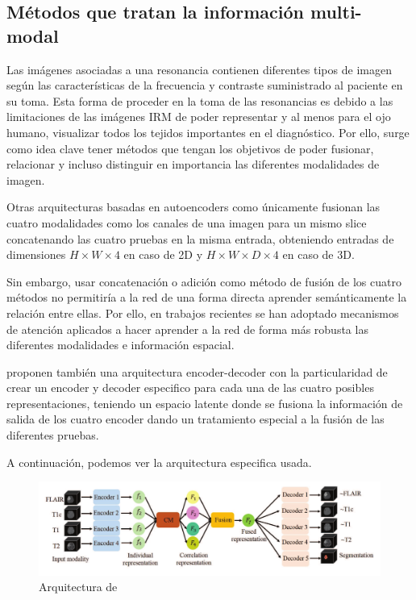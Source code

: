 			
		\subsection{Métodos que tratan la información multi-modal}
		
		Las imágenes asociadas a una resonancia contienen diferentes tipos de imagen según las características de la frecuencia y contraste suministrado al paciente en su toma. Esta forma de proceder en la toma de las resonancias es debido a las limitaciones de las imágenes IRM de poder representar y al menos para el ojo humano, visualizar todos los tejidos importantes en el diagnóstico. Por ello, surge como idea clave tener métodos que tengan los objetivos de poder fusionar, relacionar y incluso distinguir en importancia las diferentes modalidades de imagen.
		
		Otras arquitecturas basadas en autoencoders como \cite{myronenko20193d} únicamente fusionan las cuatro modalidades como los canales de una imagen para un mismo slice concatenando las cuatro pruebas en la misma entrada, obteniendo entradas de dimensiones $ H \times W \times 4 $ en caso de 2D y $ H \times W \times D \times 4$ en caso de 3D.
		
		Sin embargo, usar concatenación o adición como método de fusión de los cuatro métodos no permitiría a la red de una forma directa aprender semánticamente la relación entre ellas. Por ello, en trabajos recientes se han adoptado mecanismos de atención aplicados a hacer aprender a la red de forma más robusta las diferentes modalidades e información espacial.
		
		\cite{zhou2021latent} proponen también una arquitectura encoder-decoder con la particularidad de crear un encoder y decoder especifico para cada una de las cuatro posibles representaciones, teniendo un espacio latente donde se fusiona la información de salida de los cuatro encoder dando un tratamiento especial a la fusión de las diferentes pruebas.
		
		A continuación, podemos ver la arquitectura especifica usada.
		
		\begin{figure}[H]
			\centering
			\includegraphics[width=1.0\linewidth]{imagenes/latentcorrelationrepresentation.png}
			\caption{Arquitectura de \cite{zhou2021latent}}
		\end{figure}
		
